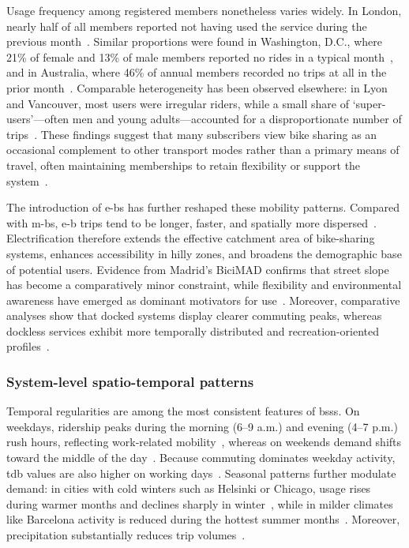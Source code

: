 Usage frequency among registered members nonetheless varies widely. In London, nearly half of all members reported not having used the service during the previous month~\cite{Fishman2016}. Similar proportions were found in Washington, D.C., where 21\% of female and 13\% of male members reported no rides in a typical month~\cite{Buck2013}, and in Australia, where 46\% of annual members recorded no trips at all in the prior month~\cite{Fishman2014}. Comparable heterogeneity has been observed elsewhere: in Lyon and Vancouver, most users were irregular riders, while a small share of ‘super-users’—often men and young adults—accounted for a disproportionate number of trips~\cite{Vogel2014, Winters2019}. These findings suggest that many subscribers view bike sharing as an occasional complement to other transport modes rather than a primary means of travel, often maintaining memberships to retain flexibility or support the system~\cite{Fishman2016}.


The introduction of \acp{e-b} has further reshaped these mobility patterns. Compared with \acp{m-b}, \ac{e-b} trips tend to be longer, faster, and spatially more dispersed~\cite{Yang2024}. Electrification therefore extends the effective catchment area of bike-sharing systems, enhances accessibility in hilly zones, and broadens the demographic base of potential users. Evidence from Madrid’s BiciMAD confirms that street slope has become a comparatively minor constraint, while flexibility and environmental awareness have emerged as dominant motivators for use~\cite{Julio2022}. Moreover, comparative analyses show that docked systems display clearer commuting peaks, whereas dockless services exhibit more temporally distributed and recreation-oriented profiles~\cite{Bonilla-Alicea2020}.

    \subsubsection{System-level spatio-temporal patterns}

    Temporal regularities are among the most consistent features of \acp{bss}. On weekdays, ridership peaks during the morning (6–9 a.m.) and evening (4–7 p.m.) rush hours, reflecting work-related mobility~\cite{Fishman2016, Zhao2015}, whereas on weekends demand shifts toward the middle of the day~\cite{Fishman2016, CortezOrdonez2024}. Because commuting dominates weekday activity, \ac{tdb} values are also higher on working days~\cite{FaghihImani2014, ElAssi2017}. Seasonal patterns further modulate demand: in cities with cold winters such as Helsinki or Chicago, usage rises during warmer months and declines sharply in winter~\cite{Willberg2021, Zhou2015, Wang2021}, while in milder climates like Barcelona activity is reduced during the hottest summer months~\cite{CortezOrdonez2024}. Moreover, precipitation substantially reduces trip volumes~\cite{Wang2021}.


